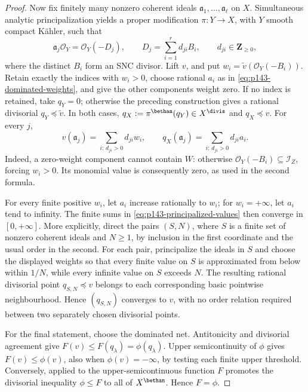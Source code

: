 \begin{proof}
Now fix finitely many nonzero coherent ideals
\(\mathfrak a_1,\ldots,\mathfrak a_\ell\) on \(X\).  Simultaneous
analytic principalization yields a proper modification \(\pi:Y\to X\),
with \(Y\) smooth compact K\"ahler, such that
\[
 \mathfrak a_j\mathcal O_Y=
 \mathcal O_Y(-D_j),\qquad
 D_j=\sum_{i=1}^r d_{ji}B_i,\qquad d_{ji}\in\mathbf Z_{\geq0},
\tag{71.41f}\label{eq:p143-simultaneous-principalization}
\]
where the distinct \(B_i\) form an SNC divisor.  Lift \(v\), and put
\(w_i=\widetilde v(\mathcal O_Y(-B_i))\).  Retain exactly the indices
with \(w_i>0\), choose rational \(a_i\) as in
\eqref{eq:p143-dominated-weights}, and give the other components weight
zero.  If no index is retained, take \(q_Y=0\); otherwise the preceding
construction gives a rational divisorial \(q_Y\preceq\widetilde v\).  In
both cases,
\(q_X:=\pi^{\bethan}(q_Y)\in X^{\divis}\) and \(q_X\preceq v\).
For every \(j\),
\[
 v(\mathfrak a_j)=\sum_{i:\,d_{ji}>0}d_{ji}w_i,\qquad
 q_X(\mathfrak a_j)=\sum_{i:\,d_{ji}>0}d_{ji}a_i.
\tag{71.41g}\label{eq:p143-principalized-values}
\]
Indeed, a zero-weight component cannot contain \(W\): otherwise
\(\mathcal O_Y(-B_i)\subseteq\mathcal I_Z\), forcing \(w_i>0\).
Its monomial value is consequently zero, as used in the second formula.

For every finite positive \(w_i\), let \(a_i\) increase rationally to
\(w_i\); for \(w_i=+\infty\), let \(a_i\) tend to infinity.  The finite
sums in \eqref{eq:p143-principalized-values} then converge in
\([0,+\infty]\).  More explicitly, direct the pairs \((S,N)\), where
\(S\) is a finite set of nonzero coherent ideals and \(N\geq1\), by
inclusion in the first coordinate and the usual order in the second.  For
each pair, principalize the ideals in \(S\) and choose the displayed
weights so that every finite value on \(S\) is approximated from below
within \(1/N\), while every infinite value on \(S\) exceeds \(N\).
The resulting rational divisorial point \(q_{S,N}\preceq v\) belongs to
each corresponding basic pointwise neighbourhood.  Hence
\((q_{S,N})\) converges to \(v\), with no order relation required between
two separately chosen divisorial points.

For the final statement, choose the dominated net.  Antitonicity and
divisorial agreement give
\(F(v)\leq F(q_\lambda)=\phi(q_\lambda)\).  Upper semicontinuity of
\(\phi\) gives \(F(v)\leq\phi(v)\), also when \(\phi(v)=-\infty\), by
testing each finite upper threshold.  Conversely,
\cite[Theorem~4.3.8]{MP24} applied to the upper-semicontinuous function
\(F\) promotes the divisorial inequality \(\phi\leq F\) to all of
\(X^{\bethan}\).  Hence \(F=\phi\).
\end{proof}

